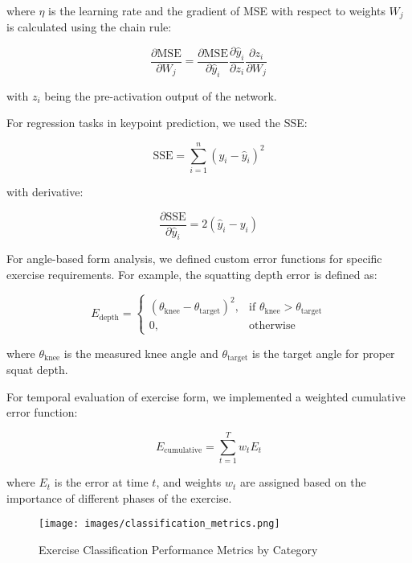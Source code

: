 \documentclass[11pt]{article}
\begin{document}
where $\eta$ is the learning rate and the gradient of MSE with respect to weights $W_j$ is calculated using the chain rule:

\begin{equation}
\frac{\partial \text{MSE}}{\partial W_j} = \frac{\partial \text{MSE}}{\partial \hat{y}_i} \frac{\partial \hat{y}_i}{\partial z_i} \frac{\partial z_i}{\partial W_j}
\end{equation}

with $z_i$ being the pre-activation output of the network.

For regression tasks in keypoint prediction, we used the SSE:

\begin{equation}
\text{SSE} = \sum_{i=1}^{n} (y_i - \hat{y}_i)^2
\end{equation}

with derivative:

\begin{equation}
\frac{\partial \text{SSE}}{\partial \hat{y}_i} = 2(\hat{y}_i - y_i)
\end{equation}

For angle-based form analysis, we defined custom error functions for specific exercise requirements. For example, the squatting depth error is defined as:

\begin{equation}
E_{\text{depth}} = 
\begin{cases}
(\theta_{\text{knee}} - \theta_{\text{target}})^2, & \text{if } \theta_{\text{knee}} > \theta_{\text{target}} \\
0, & \text{otherwise}
\end{cases}
\end{equation}

where $\theta_{\text{knee}}$ is the measured knee angle and $\theta_{\text{target}}$ is the target angle for proper squat depth.

For temporal evaluation of exercise form, we implemented a weighted cumulative error function:

\begin{equation}
E_{\text{cumulative}} = \sum_{t=1}^{T} w_t E_t
\end{equation}

where $E_t$ is the error at time $t$, and weights $w_t$ are assigned based on the importance of different phases of the exercise.

\begin{figure}[htbp]
    \centering
    \texttt{[image: images/classification\_metrics.png]}
    \caption{Exercise Classification Performance Metrics by Category}
    \label{fig:classification_metrics}
\end{figure}
\end{document}
